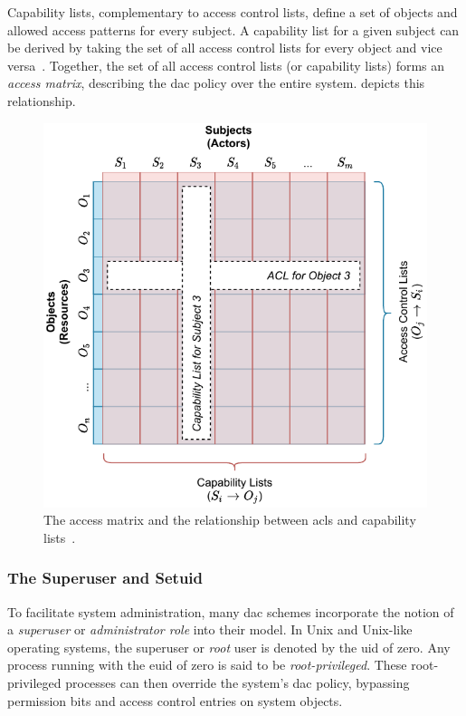 Capability lists, complementary to access control lists, define a set of objects and
allowed access patterns for every subject. A capability list for a given subject can be
derived by taking the set of all access control lists for every object and vice
versa~\cite{van_oorschot2020_tools_jewels}. Together, the set of all access control lists
(or capability lists) forms an \textit{access matrix}, describing the \gls{dac} policy over
the entire system.  depicts this relationship.

\begin{figure}[tbp]
  \centering
  \includegraphics[width=0.8\linewidth]{figs/background/acl.pdf}
  \caption[The access matrix]{
    The access matrix and the relationship between \glspl{acl} and capability
    lists~\cite{anderson1972_report, van_oorschot2020_tools_jewels, jaeger2008_os_security}.
  }%
  \label{fig:acl}
\end{figure}

\subsubsection*{The Superuser and Setuid}

To facilitate system administration, many \gls{dac} schemes incorporate the notion of
a \textit{superuser} or \textit{administrator role} into their model. In Unix and
Unix-like operating systems, the superuser or \textit{root} user is denoted by the
\gls{uid} of zero. Any process running with the \gls{euid} of zero is said to be
\textit{root-privileged}. These root-privileged processes can then override the system's
\gls{dac} policy, bypassing permission bits and access control entries on system objects.

